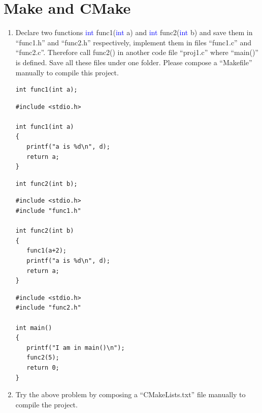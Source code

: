 \documentclass[11pt]{article}
\begin{document}
\section{Make and CMake}
\begin{enumerate}
	\item {Declare two functions \textcolor{blue}{int} func1(\textcolor{blue}{int} a) and \textcolor{blue}{int} func2(\textcolor{blue}{int} b) and save them in ``func1.h'' and ``func2.h'' respectively, implement them in files ``func1.c'' and ``func2.c''. Therefore call func2() in another code file ``proj1.c'' where ``main()'' is defined. Save all these files under one folder. Please compose a ``Makefile'' manually to compile this project.}
\begin{lstlisting}[caption=func1.h]
int func1(int a);
\end{lstlisting}	
\begin{lstlisting}[caption=func1.c]
#include <stdio.h>

int func1(int a)
{
   printf("a is %d\n", d);
   return a;
}
\end{lstlisting}	

\begin{lstlisting}[caption=func2.h]
int func2(int b);
\end{lstlisting}	
\begin{lstlisting}[caption=func2.c]
#include <stdio.h>
#include "func1.h"

int func2(int b)
{
   func1(a+2);
   printf("a is %d\n", d);
   return a;
}
\end{lstlisting}	

\begin{lstlisting}[caption=proj1.c]
#include <stdio.h>
#include "func2.h"

int main()
{
   printf("I am in main()\n");
   func2(5);
   return 0;
}
\end{lstlisting}	

	\item {Try the above problem by composing a ``CMakeLists.txt'' file manually to compile the project.}
\end{enumerate}
\end{document}
